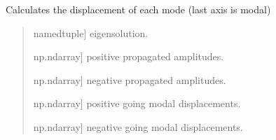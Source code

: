\documentclass[letterpaper,10pt,english]{sphinxmanual}
\begin{document}

\begin{fulllineitems}
\label{\detokenize{core:pywfe.core.forced_problem.calculate_modal_displacements}}
\pysigstartsignatures
{}
\pysigstopsignatures
\sphinxAtStartPar
Calculates the displacement of each mode (last axis is modal)
\begin{quote}\begin{description}
\begin{description}
\sphinxlineitem{\sphinxstylestrong{eigensolution}}{[}namedtuple{]}
\sphinxAtStartPar
eigensolution.

\sphinxlineitem{\sphinxstylestrong{b\_plus}}{[}np.ndarray{]}
\sphinxAtStartPar
positive propagated amplitudes.

\sphinxlineitem{\sphinxstylestrong{b\_minus}}{[}np.ndarray{]}
\sphinxAtStartPar
negative propagated amplitudes.

\end{description}

\begin{description}
\sphinxlineitem{\sphinxstylestrong{q\_j\_plus}}{[}np.ndarray{]}
\sphinxAtStartPar
positive going modal displacements.

\sphinxlineitem{\sphinxstylestrong{q\_j\_minus}}{[}np.ndarray{]}
\sphinxAtStartPar
negative going modal displacements.

\end{description}

\end{description}\end{quote}

\end{fulllineitems}

\end{document}
